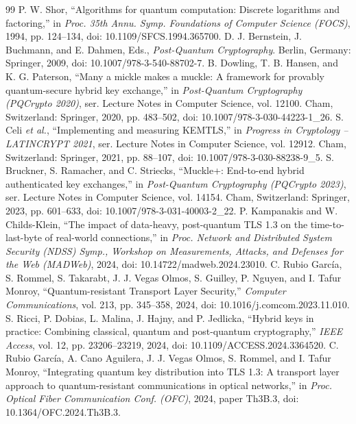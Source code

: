 \documentclass[journal]{IEEEtran}
\begin{document}
\begin{thebibliography}{99}
 P. W. Shor, ``Algorithms for quantum computation: Discrete logarithms and factoring,'' in \emph{Proc. 35th Annu. Symp. Foundations of Computer Science (FOCS)}, 1994, pp. 124--134, doi: 10.1109/SFCS.1994.365700.
 D. J. Bernstein, J. Buchmann, and E. Dahmen, Eds., \emph{Post-Quantum Cryptography}. Berlin, Germany: Springer, 2009, doi: 10.1007/978-3-540-88702-7.
 B. Dowling, T. B. Hansen, and K. G. Paterson, ``Many a mickle makes a muckle: A framework for provably quantum-secure hybrid key exchange,'' in \emph{Post-Quantum Cryptography (PQCrypto 2020)}, ser. Lecture Notes in Computer Science, vol. 12100. Cham, Switzerland: Springer, 2020, pp. 483--502, doi: 10.1007/978-3-030-44223-1\_26.
 S. Celi \emph{et al.}, ``Implementing and measuring KEMTLS,'' in \emph{Progress in Cryptology -- LATINCRYPT 2021}, ser. Lecture Notes in Computer Science, vol. 12912. Cham, Switzerland: Springer, 2021, pp. 88--107, doi: 10.1007/978-3-030-88238-9\_5.
 S. Bruckner, S. Ramacher, and C. Striecks, ``Muckle+: End-to-end hybrid authenticated key exchanges,'' in \emph{Post-Quantum Cryptography (PQCrypto 2023)}, ser. Lecture Notes in Computer Science, vol. 14154. Cham, Switzerland: Springer, 2023, pp. 601--633, doi: 10.1007/978-3-031-40003-2\_22.
 P. Kampanakis and W. Childs-Klein, ``The impact of data-heavy, post-quantum TLS 1.3 on the time-to-last-byte of real-world connections,'' in \emph{Proc. Network and Distributed System Security (NDSS) Symp., Workshop on Measurements, Attacks, and Defenses for the Web (MADWeb)}, 2024, doi: 10.14722/madweb.2024.23010.
 C. Rubio Garc\'ia, S. Rommel, S. Takarabt, J. J. Vegas Olmos, S. Guilley, P. Nguyen, and I. Tafur Monroy, ``Quantum-resistant Transport Layer Security,'' \emph{Computer Communications}, vol. 213, pp. 345--358, 2024, doi: 10.1016/j.comcom.2023.11.010.
 S. Ricci, P. Dobias, L. Malina, J. Hajny, and P. Jedlicka, ``Hybrid keys in practice: Combining classical, quantum and post-quantum cryptography,'' \emph{IEEE Access}, vol. 12, pp. 23206--23219, 2024, doi: 10.1109/ACCESS.2024.3364520.
 C. Rubio Garc\'ia, A. Cano Aguilera, J. J. Vegas Olmos, S. Rommel, and I. Tafur Monroy, ``Integrating quantum key distribution into TLS 1.3: A transport layer approach to quantum-resistant communications in optical networks,'' in \emph{Proc. Optical Fiber Communication Conf. (OFC)}, 2024, paper Th3B.3, doi: 10.1364/OFC.2024.Th3B.3.

\end{thebibliography}
\end{document}
